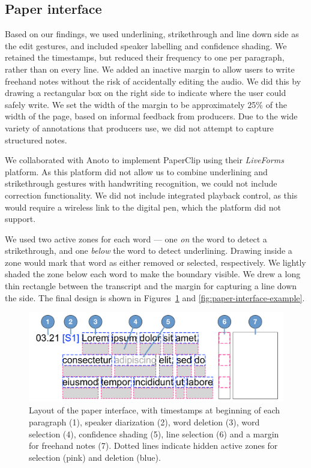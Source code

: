 \subsection{Paper interface}

Based on our findings, we used underlining, strikethrough and line down side as the edit gestures, and included speaker
labelling and confidence shading.  We retained the timestamps, but reduced their frequency to one per paragraph, rather
than on every line.  We added an inactive margin to allow users to write freehand notes without the risk of
accidentally editing the audio.  We did this by drawing a rectangular box on the right side to indicate where the user
could safely write.  We set the width of the margin to be approximately 25\% of the width of the page, based on
informal feedback from producers.  Due to the wide variety of annotations that producers use, we did not attempt to
capture structured notes.

We collaborated with Anoto to implement PaperClip using their \textit{Live\texttrademark Forms} platform. As this
platform did not allow us to combine underlining and strike\-through gestures with handwriting recognition, we could
not include correction functionality.  We did not include integrated playback control, as this would require a wireless
link to the digital pen, which the platform did not support.

We used two active zones for each word --- one \textit{on} the word to detect a strikethrough, and one \textit{below}
the word to detect underlining. Drawing inside a zone would mark that word as either removed or selected, respectively.
We lightly shaded the zone below each word to make the boundary visible.
We drew a long thin rectangle between the transcript and the margin for capturing a line down the side. The final
design is shown in Figures~\ref{fig:paper-interface-diagram} and \ref{fig:paper-interface-example}.

\begin{figure}[t]
  \centering
  \includegraphics[width=\columnwidth]{figs/paper-interface-diagram.pdf}
  \caption[Layout of the paper interface.]{Layout of the paper interface, with timestamps at beginning of each
  paragraph (1), speaker diarization (2), word deletion (3), word selection (4), confidence shading (5), line selection
(6) and a margin for freehand notes (7). Dotted lines indicate hidden active zones for selection (pink) and deletion
(blue).}
  \label{fig:paper-interface-diagram}
\end{figure}

